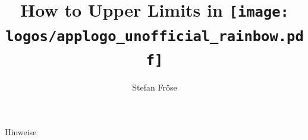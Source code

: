 \documentclass[aspectratio=1610, 9pt]{beamer}
\title{How to Upper Limits in \texttt{[image: logos/applogo\_unofficial\_rainbow.pdf]}}
\author[S.~Fröse]{Stefan Fröse}
\begin{document}
\maketitle

\begin{frame}{Hinweise}
\end{frame}
\end{document}
